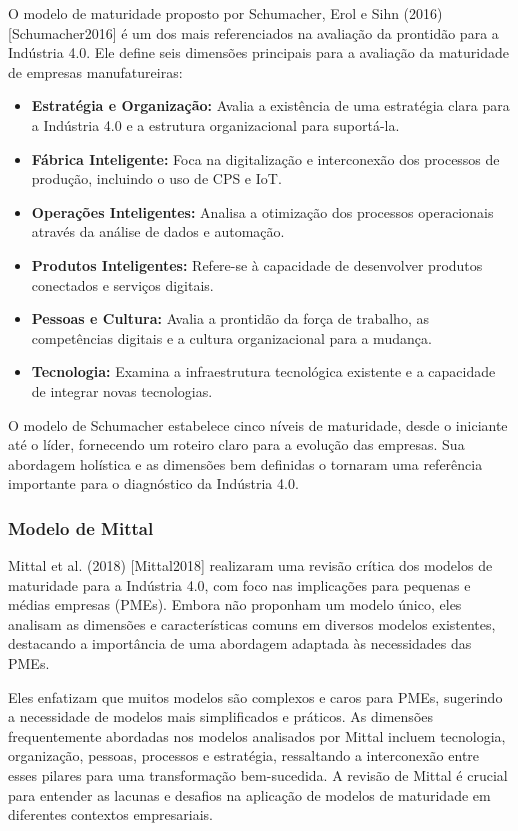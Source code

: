 O modelo de maturidade proposto por Schumacher, Erol e Sihn (2016) [Schumacher2016] é um dos mais referenciados na avaliação da prontidão para a Indústria 4.0. Ele define seis dimensões principais para a avaliação da maturidade de empresas manufatureiras:
\begin{itemize}
    \item \textbf{Estratégia e Organização:} Avalia a existência de uma estratégia clara para a Indústria 4.0 e a estrutura organizacional para suportá-la.
    \item \textbf{Fábrica Inteligente:} Foca na digitalização e interconexão dos processos de produção, incluindo o uso de CPS e IoT.
    \item \textbf{Operações Inteligentes:} Analisa a otimização dos processos operacionais através da análise de dados e automação.
    \item \textbf{Produtos Inteligentes:} Refere-se à capacidade de desenvolver produtos conectados e serviços digitais.
    \item \textbf{Pessoas e Cultura:} Avalia a prontidão da força de trabalho, as competências digitais e a cultura organizacional para a mudança.
    \item \textbf{Tecnologia:} Examina a infraestrutura tecnológica existente e a capacidade de integrar novas tecnologias.
\end{itemize}

O modelo de Schumacher estabelece cinco níveis de maturidade, desde o iniciante até o líder, fornecendo um roteiro claro para a evolução das empresas. Sua abordagem holística e as dimensões bem definidas o tornaram uma referência importante para o diagnóstico da Indústria 4.0.

\subsubsection{Modelo de Mittal}

Mittal et al. (2018) [Mittal2018] realizaram uma revisão crítica dos modelos de maturidade para a Indústria 4.0, com foco nas implicações para pequenas e médias empresas (PMEs). Embora não proponham um modelo único, eles analisam as dimensões e características comuns em diversos modelos existentes, destacando a importância de uma abordagem adaptada às necessidades das PMEs.

Eles enfatizam que muitos modelos são complexos e caros para PMEs, sugerindo a necessidade de modelos mais simplificados e práticos. As dimensões frequentemente abordadas nos modelos analisados por Mittal incluem tecnologia, organização, pessoas, processos e estratégia, ressaltando a interconexão entre esses pilares para uma transformação bem-sucedida. A revisão de Mittal é crucial para entender as lacunas e desafios na aplicação de modelos de maturidade em diferentes contextos empresariais.

